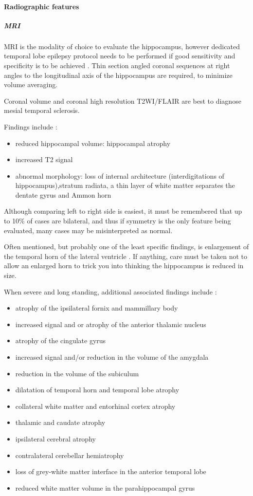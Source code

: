 \paragraph{Radiographic features}

\subparagraph{MRI}

MRI is the modality of choice to evaluate the hippocampus, however dedicated temporal lobe epilepsy protocol needs to be performed if good sensitivity and specificity is to be achieved . Thin section angled coronal sequences at right angles to the longitudinal axis of the hippocampus are required, to minimize volume averaging.

Coronal volume and coronal high resolution T2WI/FLAIR are best to diagnose mesial temporal sclerosis.

Findings include :

\begin{itemize}
	\item
	reduced hippocampal volume: hippocampal atrophy
	\item
	increased T2 signal
	\item
	abnormal morphology: loss of internal architecture (interdigitations of hippocampus),stratum radiata, a thin layer of white matter separates the dentate gyrus and Ammon horn
\end{itemize}

Although comparing left to right side is easiest, it must be remembered that up to 10\% of cases are bilateral, and thus if symmetry is the only feature being evaluated, many cases may be misinterpreted as normal.

Often mentioned, but probably one of the least specific findings, is enlargement of the temporal horn of the lateral ventricle . If anything, care must be taken not to allow an enlarged horn to trick you into thinking the hippocampus is reduced in size.

When severe and long standing, additional associated findings include :

\begin{itemize}
	\item
	atrophy of the ipsilateral fornix and mammillary body
	\item
	increased signal and or atrophy of the anterior thalamic nucleus
	\item
	atrophy of the cingulate gyrus
	\item
	increased signal and/or reduction in the volume of the amygdala
	\item
	reduction in the volume of the subiculum
	\item
	dilatation of temporal horn and temporal lobe atrophy
	\item
	collateral white matter and entorhinal cortex atrophy
	\item
	thalamic and caudate atrophy
	\item
	ipsilateral cerebral atrophy
	\item
	contralateral cerebellar hemiatrophy
	\item
	loss of grey-white matter interface in the anterior temporal lobe 
	\item
	reduced white matter volume in the parahippocampal gyrus 
\end{itemize}

